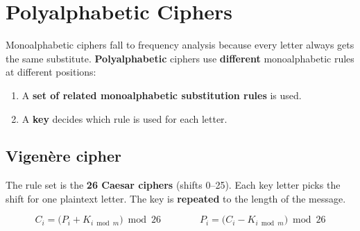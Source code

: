 \section{Polyalphabetic Ciphers}\label{sec:poly}

Monoalphabetic ciphers fall to frequency analysis because every letter always gets the same substitute. \textbf{Polyalphabetic} ciphers use \textbf{different} monoalphabetic rules at different positions:
\begin{keybox}
\begin{enumerate}[leftmargin=1.5em]
  \item A \textbf{set of related monoalphabetic substitution rules} is used.
  \item A \textbf{key} decides which rule is used for each letter.
\end{enumerate}
\end{keybox}

\subsection{Vigen\`ere cipher}
The rule set is the \textbf{26 Caesar ciphers} (shifts 0--25). Each key letter picks the shift for one plaintext letter. The key is \textbf{repeated} to the length of the message.
\begin{keybox}[title=Vigen\`ere (key length $m$)]
\vspace{-6pt}
\[
C_i = \big(P_i + K_{i \bmod m}\big) \bmod 26 \qquad\qquad P_i = \big(C_i - K_{i \bmod m}\big) \bmod 26
\]
\end{keybox}

